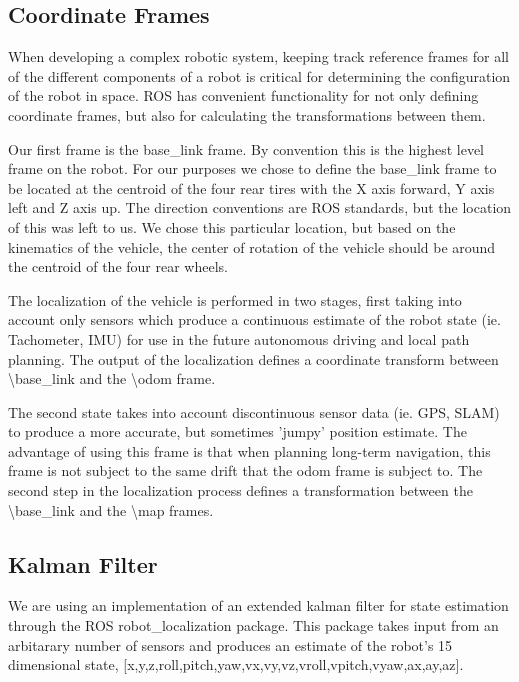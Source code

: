 \subsection{Coordinate Frames}

When developing a complex robotic system, keeping track reference frames for all of the different components of a robot is critical for determining the configuration of the robot in space. ROS has convenient functionality for not only defining coordinate frames, but also for calculating the transformations between them. 

Our first frame is the base\_link frame. By convention this is the highest level frame on the robot. For our purposes we chose to define the base\_link frame to be located at the centroid of the four rear tires with the X axis forward, Y axis left and Z axis up. The direction conventions are ROS standards, but the location of this was left to us. We chose this particular location, but based on the kinematics of the vehicle, the center of rotation of the vehicle should be around the centroid of the four rear wheels. 

The localization of the vehicle is performed in two stages, first taking into account only sensors which produce a continuous estimate of the robot state (ie. Tachometer, IMU) for use in the future autonomous driving and local path planning. The output of the localization defines a coordinate transform between \textbackslash base\_link and the \textbackslash odom frame.

The second state takes into account discontinuous sensor data (ie. GPS, SLAM) to produce a more accurate, but sometimes 'jumpy' position estimate. The advantage of using this frame is that when planning long-term navigation, this frame is not subject to the same drift that the odom frame is subject to. The second step in the localization process defines a transformation between the \textbackslash base\_link and the \textbackslash map frames.

\subsection{Kalman Filter}

We are using an implementation of an extended kalman filter for state estimation through the ROS robot\_localization package. This package takes input from an arbitarary number of sensors and produces an estimate of the robot's 15 dimensional state, [x,y,z,roll,pitch,yaw,vx,vy,vz,vroll,vpitch,vyaw,ax,ay,az]\cite{Moore2016}. 

